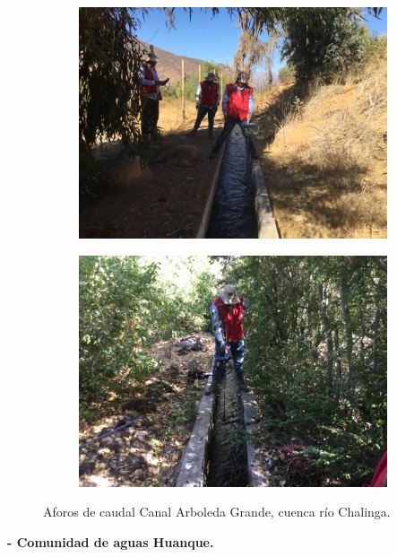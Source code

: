 \documentclass[]{article}
\begin{document}
\begin{figure}[H]
  \centering
\begin{subfigure}{.45\textwidth}
\hfill
  \includegraphics[angle= 180, width=\textwidth]{Foto/a3.jpg}
\end{subfigure}
\hfill
\begin{subfigure}{.45\textwidth}
\hfill
  \includegraphics[angle= 180, width=\textwidth]{Foto/a4.jpg} 
\end{subfigure}
\caption{Aforos de caudal Canal Arboleda Grande, cuenca río Chalinga.}
\end{figure}
\clearpage

\textbf{- Comunidad de aguas Huanque.}
\end{document}
